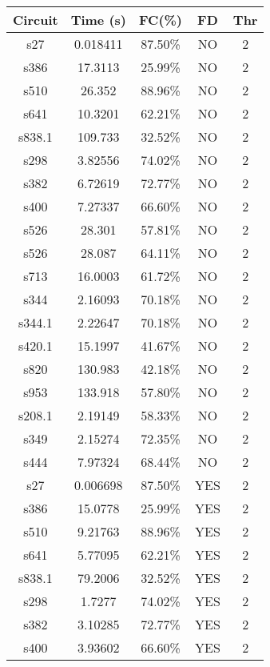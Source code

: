 \documentclass[a4paper,11pt]{article}
\begin{document}
\begin{center}
\begin{tabular}{||c c c c c||}
\hline
Circuit & Time (s) & FC(\%) & FD & Thr \\ [0.5ex] 
\hline\hline
 s27 & 0.018411 & 87.50\% & NO  & 2 \\ 
\hline
 s386 & 17.3113 & 25.99\% & NO  & 2 \\ 
\hline
 s510 & 26.352 & 88.96\% & NO  & 2 \\ 
\hline
 s641 & 10.3201 & 62.21\% & NO  & 2 \\ 
\hline
 s838.1 & 109.733 & 32.52\% & NO  & 2 \\ 
\hline
 s298 & 3.82556 & 74.02\% & NO  & 2 \\ 
\hline
 s382 & 6.72619 & 72.77\% & NO  & 2 \\ 
\hline
 s400 & 7.27337 & 66.60\% & NO  & 2 \\ 
\hline
 s526 & 28.301 & 57.81\% & NO  & 2 \\ 
\hline
 s526 & 28.087 & 64.11\% & NO  & 2 \\ 
\hline
 s713 & 16.0003 & 61.72\% & NO  & 2 \\ 
\hline
 s344 & 2.16093 & 70.18\% & NO  & 2 \\ 
\hline
 s344.1 & 2.22647 & 70.18\% & NO  & 2 \\ 
\hline
 s420.1 & 15.1997 & 41.67\% & NO  & 2 \\ 
\hline
 s820 & 130.983 & 42.18\% & NO  & 2 \\ 
\hline
 s953 & 133.918 & 57.80\% & NO  & 2 \\ 
\hline
 s208.1 & 2.19149 & 58.33\% & NO  & 2 \\ 
\hline
 s349 & 2.15274 & 72.35\% & NO  & 2 \\ 
\hline
 s444 & 7.97324 & 68.44\% & NO  & 2 \\ 
\hline
 s27 & 0.006698 & 87.50\% & YES  & 2 \\ 
\hline
 s386 & 15.0778 & 25.99\% & YES  & 2 \\ 
\hline
 s510 & 9.21763 & 88.96\% & YES  & 2 \\ 
\hline
 s641 & 5.77095 & 62.21\% & YES  & 2 \\ 
\hline
 s838.1 & 79.2006 & 32.52\% & YES  & 2 \\ 
\hline
 s298 & 1.7277 & 74.02\% & YES  & 2 \\ 
\hline
 s382 & 3.10285 & 72.77\% & YES  & 2 \\ 
\hline
 s400 & 3.93602 & 66.60\% & YES  & 2 \\ 
\hline

\end{tabular}
\end{center}
\end{document}
